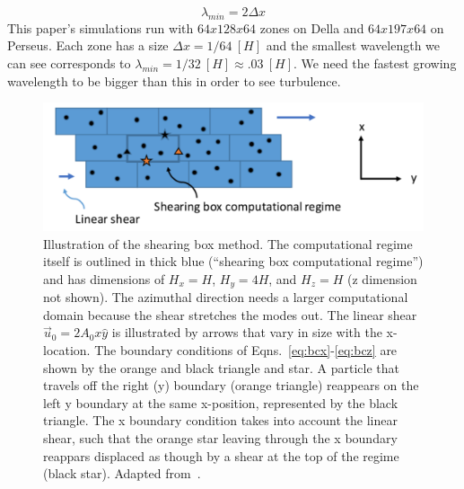 \begin{equation*}
  \lambda_{min}=2\Delta x
\end{equation*}
This paper's simulations run with $64x128x64$ zones on Della and $64x197x64$ on Perseus. Each zone has a size $\Delta x=1/64~[H]$ and the smallest wavelength we can see corresponds to $\lambda_{min}=1/32~[H]\approx.03~[H]$. We need the fastest growing wavelength to be bigger than this in order to see turbulence.
\begin{figure}[h]
  \begin{center}  
    \includegraphics [width=\textwidth, angle=0.]{img/ShearingBox.pdf}
  \end{center}
  \caption{Illustration of the shearing box method. The computational regime itself is outlined in thick blue (``shearing box computational regime'') and has dimensions of $H_x=H$, $H_y=4H$, and $H_z=H$ (z dimension not shown). The azimuthal direction needs a larger computational domain because the shear stretches the modes out. The linear shear $\vec u_0=2A_0x\hat y$ is illustrated by arrows that vary in size with the x-location. The boundary conditions of Eqns.~\ref{eq:bcx}-\ref{eq:bcz} are shown by the orange and black triangle and star. A particle that travels off the right (y) boundary (orange triangle) reappears on the left y boundary at the same x-position, represented by the black triangle. The x boundary condition takes into account the linear shear, such that the orange star leaving through the x boundary reappars displaced as though by a shear at the top of the regime (black star). Adapted from~.}
  \label{fig:shearingbox}
\end{figure}


